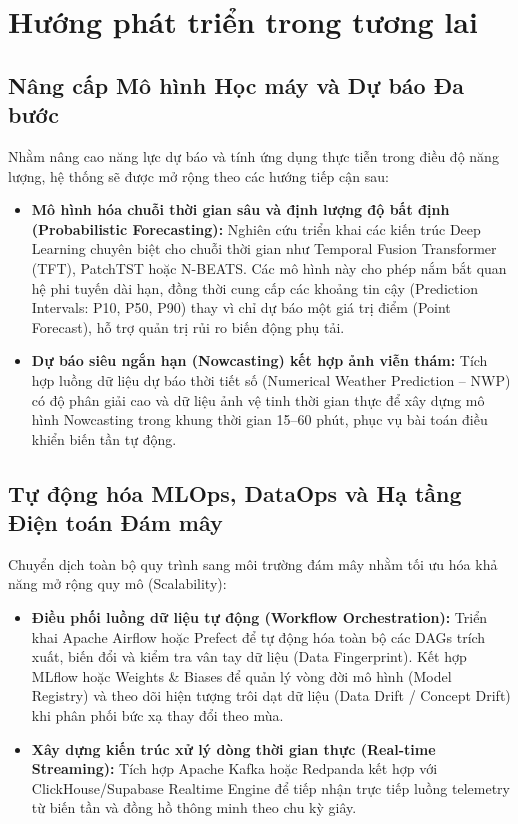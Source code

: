 \documentclass[12pt, a4paper]{report}
\begin{document}
\section{Hướng phát triển trong tương lai}
\label{sec:future_work}

\subsection{Nâng cấp Mô hình Học máy và Dự báo Đa bước}
\label{subsec:future_ml}
Nhằm nâng cao năng lực dự báo và tính ứng dụng thực tiễn trong điều độ năng lượng, hệ thống sẽ được mở rộng theo các hướng tiếp cận sau:
\begin{itemize}
    \item \textbf{Mô hình hóa chuỗi thời gian sâu và định lượng độ bất định (Probabilistic Forecasting):} Nghiên cứu triển khai các kiến trúc Deep Learning chuyên biệt cho chuỗi thời gian như Temporal Fusion Transformer (TFT), PatchTST hoặc N-BEATS. Các mô hình này cho phép nắm bắt quan hệ phi tuyến dài hạn, đồng thời cung cấp các khoảng tin cậy (Prediction Intervals: P10, P50, P90) thay vì chỉ dự báo một giá trị điểm (Point Forecast), hỗ trợ quản trị rủi ro biến động phụ tải.
    \item \textbf{Dự báo siêu ngắn hạn (Nowcasting) kết hợp ảnh viễn thám:} Tích hợp luồng dữ liệu dự báo thời tiết số (Numerical Weather Prediction -- NWP) có độ phân giải cao và dữ liệu ảnh vệ tinh thời gian thực để xây dựng mô hình Nowcasting trong khung thời gian 15--60 phút, phục vụ bài toán điều khiển biến tần tự động.
\end{itemize}

\subsection{Tự động hóa MLOps, DataOps và Hạ tầng Điện toán Đám mây}
\label{subsec:future_cloud_mlops}
Chuyển dịch toàn bộ quy trình sang môi trường đám mây nhằm tối ưu hóa khả năng mở rộng quy mô (Scalability):
\begin{itemize}
    \item \textbf{Điều phối luồng dữ liệu tự động (Workflow Orchestration):} Triển khai Apache Airflow hoặc Prefect để tự động hóa toàn bộ các DAGs trích xuất, biến đổi và kiểm tra vân tay dữ liệu (Data Fingerprint). Kết hợp MLflow hoặc Weights \& Biases để quản lý vòng đời mô hình (Model Registry) và theo dõi hiện tượng trôi dạt dữ liệu (Data Drift / Concept Drift) khi phân phối bức xạ thay đổi theo mùa.
    \item \textbf{Xây dựng kiến trúc xử lý dòng thời gian thực (Real-time Streaming):} Tích hợp Apache Kafka hoặc Redpanda kết hợp với ClickHouse/Supabase Realtime Engine để tiếp nhận trực tiếp luồng telemetry từ biến tần và đồng hồ thông minh theo chu kỳ giây.
\end{itemize}
\end{document}
